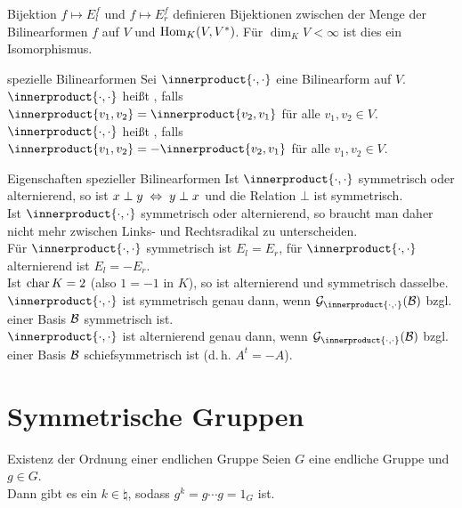 \begin{Satz}{Bijektion}
    $f \mapsto E_l^f$ und $f \mapsto E_r^f$ definieren Bijektionen zwischen
    der Menge der Bilinearformen $f$ auf $V$ und $\operatorname{Hom}_K(V, V^\ast)$.
    Für $\dim_K V < \infty$ ist dies ein Isomorphismus.
\end{Satz}

\begin{Def}{spezielle Bilinearformen}
    Sei $\innerproduct{\cdot, \cdot}$ eine Bilinearform auf $V$. \\
    $\innerproduct{\cdot, \cdot}$ heißt , falls
    $\innerproduct{v_1, v_2} = \innerproduct{v_2, v_1}$ für alle $v_1, v_2 \in V$. \\
    $\innerproduct{\cdot, \cdot}$ heißt , falls
    $\innerproduct{v_1, v_2} = -\innerproduct{v_2, v_1}$ für alle $v_1, v_2 \in V$.
\end{Def}

\begin{Lemma}{Eigenschaften spezieller Bilinearformen}
    Ist $\innerproduct{\cdot, \cdot}$ symmetrisch oder alternierend, so ist
    $x \;\bot\; y \;\Leftrightarrow\; y \;\bot\; x$ und die Relation $\bot$ ist
    symmetrisch. \\
    Ist $\innerproduct{\cdot, \cdot}$ symmetrisch oder alternierend, so braucht man
    daher nicht mehr zwischen Links- und Rechtsradikal zu unterscheiden. \\
    Für $\innerproduct{\cdot, \cdot}$ symmetrisch ist $E_l = E_r$,
    für $\innerproduct{\cdot, \cdot}$ alternierend ist $E_l = -E_r$. \\
    Ist $\operatorname{char} K = 2$ (also $1 = -1$ in $K$), so ist alternierend und
    symmetrisch dasselbe. \\
    $\innerproduct{\cdot, \cdot}$ ist symmetrisch genau dann, wenn
    $\grammatrix_{\innerproduct{\cdot, \cdot}}(\basis{B})$ bzgl. einer Basis $\mathcal{B}$
    symmetrisch ist. \\
    $\innerproduct{\cdot, \cdot}$ ist alternierend genau dann, wenn
    $\grammatrix_{\innerproduct{\cdot, \cdot}}(\basis{B})$ bzgl. einer Basis $\mathcal{B}$
    schiefsymmetrisch ist (d.\,h. $A^t = -A$).
\end{Lemma}

\section{%
    Symmetrische Gruppen%
}

\begin{Satz}{Existenz der Ordnung einer endlichen Gruppe}
    Seien $G$ eine endliche Gruppe und $g \in G$. \\
    Dann gibt es ein $k \in \natural$, sodass $g^k = g \dotsm g = 1_G$ ist.
\end{Satz}

